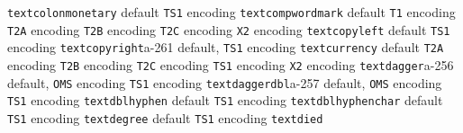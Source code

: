 \documentclass[twoside]{ltxdoc}
\makeatletter
\renewenvironment{theindex}{%
   \@restonecoltrue
   \if@twocolumn\@restonecolfalse\fi
   \columnseprule \z@
   \columnsep 35\p@
   \twocolumn[\index@prologue]%
   \IndexParms
   \let\item\@idxitem
   \ignorespaces
}{\if@restonecol\onecolumn\else\clearpage\fi}
\makeatother
\begin{document}
\begin{theindex}
  \item \texttt  {textcolonmonetary}\efill 
    \subitem default\pfill {}
    \subitem \texttt  {TS1} encoding\pfill {}
  \item \texttt  {textcompwordmark}\efill 
    \subitem default\pfill {}
    \subitem \texttt  {T1} encoding\pfill {}
    \subitem \texttt  {T2A} encoding\pfill {}
    \subitem \texttt  {T2B} encoding\pfill {}
    \subitem \texttt  {T2C} encoding\pfill {}
    \subitem \texttt  {X2} encoding\pfill {}
  \item \texttt  {textcopyleft}\efill 
    \subitem default\pfill {}
    \subitem \texttt  {TS1} encoding\pfill {}
  \item \texttt  {textcopyright}\pfill a-261
    \subitem default\pfill {}, 
    \subitem \texttt  {TS1} encoding\pfill {}
  \item \texttt  {textcurrency}\efill 
    \subitem default\pfill {}
    \subitem \texttt  {T2A} encoding\pfill {}
    \subitem \texttt  {T2B} encoding\pfill {}
    \subitem \texttt  {T2C} encoding\pfill {}
    \subitem \texttt  {TS1} encoding\pfill {}
    \subitem \texttt  {X2} encoding\pfill {}
  \item \texttt  {textdagger}\pfill a-256
    \subitem default\pfill {}, 
    \subitem \texttt  {OMS} encoding\pfill {}
    \subitem \texttt  {TS1} encoding\pfill {}
  \item \texttt  {textdaggerdbl}\pfill a-257
    \subitem default\pfill {}, 
    \subitem \texttt  {OMS} encoding\pfill {}
    \subitem \texttt  {TS1} encoding\pfill {}
  \item \texttt  {textdblhyphen}\efill 
    \subitem default\pfill {}
    \subitem \texttt  {TS1} encoding\pfill {}
  \item \texttt  {textdblhyphenchar}\efill 
    \subitem default\pfill {}
    \subitem \texttt  {TS1} encoding\pfill {}
  \item \texttt  {textdegree}\efill 
    \subitem default\pfill {}
    \subitem \texttt  {TS1} encoding\pfill {}
  \item \texttt  {textdied}\efill 

\end{theindex}
\end{document}
